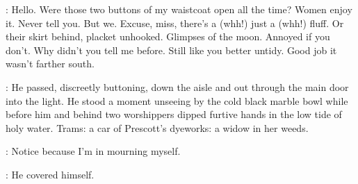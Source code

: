 \BloomInt:
Hello.
Were those two buttons of my waistcoat open all the time?
Women enjoy it.
Never tell you.
But we.
Excuse, miss, there's a (whh!)
just a (whh!) fluff.
Or their skirt behind, placket unhooked.
Glimpses of the moon.
Annoyed if you don't.
Why didn't you tell me before.
Still like you better untidy.
Good job it wasn't farther south.

:
He passed, discreetly buttoning,
down the aisle and out through the main door into the light.
He stood a moment unseeing
by the cold black marble bowl
while before him and behind
two worshippers dipped furtive hands in the low tide of holy water.
Trams:
a car of Prescott's dyeworks:
a widow in her weeds.

\BloomInt:
Notice because I'm in mourning myself.

:
He covered himself.
